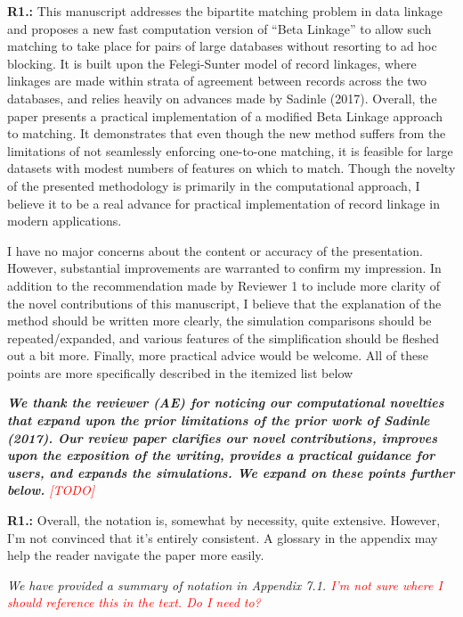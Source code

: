 \documentclass[letterpaper, parskip]{scrartcl}
\newcommand{\pointRaised}[2]{%
	\textbf{#1.\theresponsectr:} #2
}
\newcounter{responsectr}[section]     %
\newcommand{\reply}[1]{%
	\refstepcounter{responsectr}%
		\begin{tcolorbox}
			\itshape #1
		\end{tcolorbox}
}
\newcommand{\todo}{\textcolor{red}{[TODO]}\xspace}
\begin{document}


	\setcounter{responsectr}{0}

	\pointRaised{R1}{%
	This manuscript addresses the bipartite matching problem in data linkage and proposes a new fast computation version of “Beta Linkage” to allow such matching to take place for pairs of large databases without resorting to ad hoc blocking. It is built upon the Felegi-Sunter model of record linkages, where linkages are made within strata of agreement between records across the two databases, and relies heavily on advances made by Sadinle (2017). Overall, the paper presents a practical implementation of a modified Beta Linkage approach to	matching. It demonstrates that even though the new method suffers from the limitations of not seamlessly enforcing one-to-one matching, it is feasible for large datasets with modest numbers of features on which to match. Though the novelty of the presented methodology is primarily in the computational approach, I believe it to be a real advance for practical implementation of record linkage in modern applications.
	
	I have no major concerns about the content or accuracy of the presentation. However, substantial improvements are warranted to confirm my impression. In addition to the recommendation made by Reviewer 1 to include more clarity of the novel contributions of this manuscript, I believe that the explanation of the method should be written more clearly, the simulation comparisons should be repeated/expanded, and various features of the simplification should be fleshed out a bit more. Finally, more practical advice would be welcome. All of these points are more specifically described in the itemized list below
	}

	\reply{%
	\textbf{We thank the reviewer (AE) for noticing our computational novelties that expand upon the prior limitations of the prior work of Sadinle (2017). Our review paper clarifies our novel contributions, improves upon the exposition of the writing, provides a practical guidance for users, and expands the simulations. We expand on these points further below.} \todo
	}


	\pointRaised{R1}{%
		Overall, the notation is, somewhat by necessity, quite extensive. However, I’m not convinced that it’s entirely consistent. A glossary in the appendix may help the reader navigate the paper more easily.}
\reply{%
	We have provided a summary of notation in Appendix 7.1. \textcolor{red}{I'm not sure where I should reference this in the text. Do I need to?}
}
\end{document}
